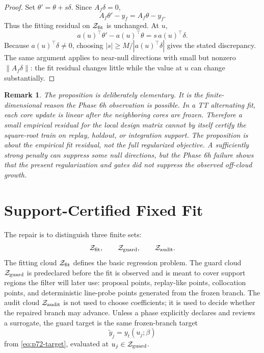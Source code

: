 \documentclass[11pt]{article}
\newtheorem{remark}{Remark}
\newcommand{\calZ}{\mathcal Z}
\begin{document}
\begin{proof}
Set \(\theta'=\theta+s\delta\).  Since \(A_f\delta=0\),
\[
    A_f\theta'-y_f=A_f\theta-y_f.
\]
Thus the fitting residual on \(\calZ_{\rm fit}\) is unchanged.  At \(u\),
\[
    a(u)^\top\theta'-a(u)^\top\theta
    =
    s\,a(u)^\top\delta .
\]
Because \(a(u)^\top\delta\ne0\), choosing
\(|s|\ge M/|a(u)^\top\delta|\) gives the stated discrepancy.  The same
argument applies to near-null directions with small but nonzero
\(\|A_f\delta\|\): the fit residual changes little while the value at \(u\)
can change substantially.
\end{proof}

\begin{remark}
The proposition is deliberately elementary.  It is the finite-dimensional
reason the Phase 6h observation is possible.  In a TT alternating fit, each
core update is linear after the neighboring cores are frozen.  Therefore a
small empirical residual for the local design matrix cannot by itself certify
the square-root train on replay, holdout, or integration support.  The
proposition is about the empirical fit residual, not the full regularized
objective.  A sufficiently strong penalty can suppress some null directions,
but the Phase 6h failure shows that the present regularization and gates did
not suppress the observed off-cloud growth.
\end{remark}

\section{Support-Certified Fixed Fit}

The repair is to distinguish three finite sets:
\[
    \calZ_{\rm fit},\qquad
    \calZ_{\rm guard},\qquad
    \calZ_{\rm audit}.
\]
The fitting cloud \(\calZ_{\rm fit}\) defines the basic regression problem.
The guard cloud \(\calZ_{\rm guard}\) is predeclared before the fit is
observed and is meant to cover support regions the filter will later use:
proposal points, replay-like points, collocation points, and deterministic
line-probe points generated from the frozen branch.  The audit cloud
\(\calZ_{\rm audit}\) is not used to choose coefficients; it is used to decide
whether the repaired branch may advance.  Unless a phase explicitly declares
and reviews a surrogate, the guard target is the same frozen-branch target
\[
    \widetilde y_j = y_t(u_j;\beta)
\]
from \eqref{eq:p72-target}, evaluated at \(u_j\in\calZ_{\rm guard}\).
\end{document}
